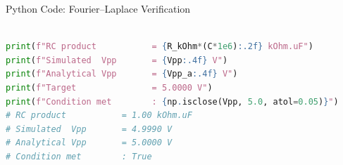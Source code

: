 \documentclass{beamer}
\numberwithin{equation}{section}
\theoremstyle{remark}
\begin{document}
\begin{frame}[fragile]{Python Code: Fourier--Laplace Verification}
 
\lstset{basicstyle=\ttfamily\scriptsize}
\begin{lstlisting}[language=Python]

print(f"RC product           = {R_kOhm*(C*1e6):.2f} kOhm.uF")
print(f"Simulated  Vpp       = {Vpp:.4f} V")
print(f"Analytical Vpp       = {Vpp_a:.4f} V")
print(f"Target               = 5.0000 V")
print(f"Condition met        : {np.isclose(Vpp, 5.0, atol=0.05)}")
# RC product           = 1.00 kOhm.uF
# Simulated  Vpp       = 4.9990 V
# Analytical Vpp       = 5.0000 V
# Condition met        : True
\end{lstlisting}
 
\end{frame}
\end{document}
